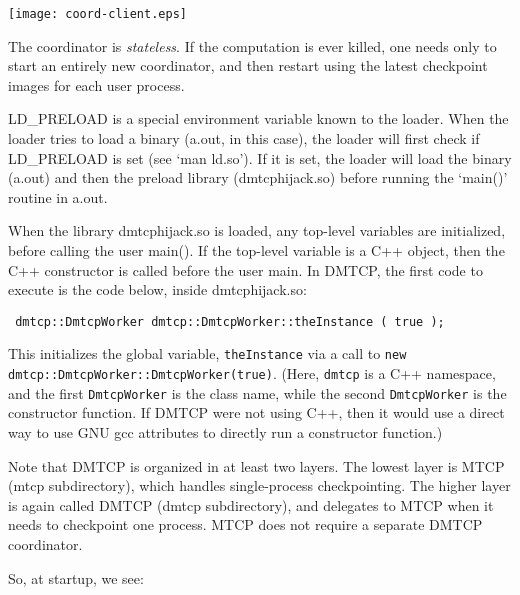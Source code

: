 \documentclass{article}
\begin{document}
\begin{center}
\texttt{[image: coord-client.eps]}
\end{center}

The coordinator is {\em stateless}.  If the computation is ever killed,
one needs only to start an entirely new coordinator, and then restart
using the latest checkpoint images for each user process.

LD\_PRELOAD is a special environment variable known to the loader.
When the loader tries to load a binary (a.out, in this case), the loader
will first check if LD\_PRELOAD is set (see `man ld.so').  If it is
set, the loader will load the binary (a.out) and then the preload library
(dmtcphijack.so) before running the `main()' routine in a.out.

When the library dmtcphijack.so is loaded, any top-level variables
are initialized, before calling the user main().  If the top-level variable
is a C++ object, then the C++ constructor is called before the
user main.  In DMTCP, the first code to execute is the code
below, inside dmtcphijack.so:

{\tt
dmtcp::DmtcpWorker dmtcp::DmtcpWorker::theInstance ( true );
}

This initializes the global variable, {\tt theInstance} via a call
to {\tt new dmtcp::DmtcpWorker::DmtcpWorker(true)}.  (Here, {\tt dmtcp}
is a C++ namespace, and the first {\tt DmtcpWorker} is the class name,
while the second {\tt DmtcpWorker} is the constructor function.  If DMTCP were
not using C++, then it would use a direct way to use GNU gcc attributes
to directly run a constructor function.)

Note that DMTCP is organized in at least two layers.  The lowest layer
is MTCP (mtcp subdirectory), which handles single-process checkpointing.
The higher layer is again called DMTCP (dmtcp subdirectory), and delegates
to MTCP when it needs to checkpoint one process.  MTCP does not require
a separate DMTCP coordinator.

So, at startup, we see:
\end{document}
